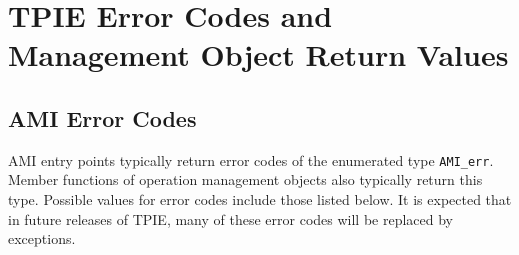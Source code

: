 
\chapter{TPIE Error Codes and Management Object Return Values}


\section{AMI Error Codes}
\label{sec:ami-errors}


AMI entry points typically return error codes of the enumerated type
\lstinline|AMI_err|.  Member functions of operation management
objects also typically return this
type.  Possible values for error codes include those listed below.  It
is expected that in future releases of TPIE, many of these error codes
will be replaced by exceptions.

